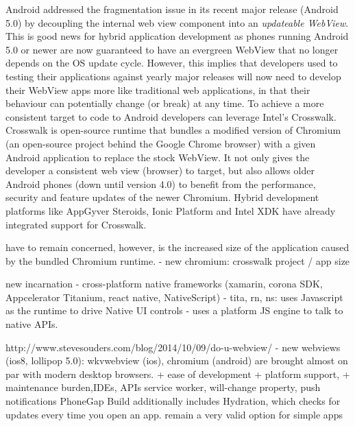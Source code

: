 \documentclass[thesis.tex]{subfiles}
\begin{document}
Android addressed the fragmentation issue in its recent major release (Android 5.0) by decoupling the internal web view component into an \textit{updateable WebView}. This is good news for hybrid application development as phones running Android 5.0 or newer are now guaranteed to have an evergreen WebView that no longer depends on the OS update cycle. However, this implies that developers used to testing their applications against yearly major releases will now need to develop their WebView apps more like traditional web applications, in that their behaviour can potentially change (or break) at any time. To achieve a more consistent target to code to Android developers can leverage Intel's Crosswalk. Crosswalk is open-source runtime that bundles a modified version of Chromium (an open-source project behind the Google Chrome browser) with a given Android application to replace the stock WebView. It not only gives the developer a consistent web view (browser) to target, but also allows older Android phones (down until version 4.0) to benefit from the performance, security and feature updates of the newer Chromium. Hybrid development platforms like AppGyver Steroids, Ionic Platform and Intel XDK have already integrated support for Crosswalk.

have to remain concerned, however, is the increased size of the application caused by the bundled Chromium runtime.
- new chromium: crosswalk project / app size

new incarnation
- cross-platform native frameworks (xamarin, corona SDK, Appcelerator Titanium, react native, NativeScript)
	- tita, rn, ns: uses Javascript as the runtime to drive Native UI controls
	- uses a platform JS engine to talk to native APIs.

http://www.stevesouders.com/blog/2014/10/09/do-u-webview/
- new webviews (ios8, lollipop 5.0): wkvwebview (ios), chromium (android)
are brought almost on par with modern desktop browsers.
+ ease of development
+ platform support,
+ maintenance burden,IDEs, APIs
service worker, will-change property, push notifications
PhoneGap Build additionally includes Hydration, which checks for updates every time you open an app.
remain a very valid option for simple apps
\end{document}
